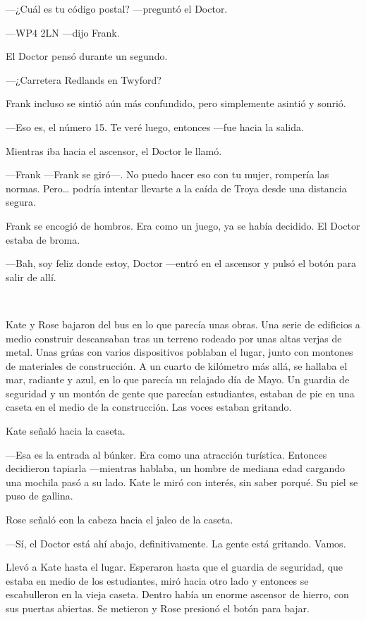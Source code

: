 ---¿Cuál es tu código postal? ---preguntó el Doctor.

---WP4 2LN ---dijo Frank.

El Doctor pensó durante un segundo.

---¿Carretera Redlands en Twyford?

Frank incluso se sintió aún más confundido, pero simplemente asintió y
sonrió.

---Eso es, el número 15. Te veré luego, entonces ---fue hacia la salida.

Mientras iba hacia el ascensor, el Doctor le llamó.

---Frank ---Frank se giró---. No puedo hacer eso con tu mujer, rompería las
normas. Pero\ldots{} podría intentar llevarte a la caída de Troya desde
una distancia segura.

Frank se encogió de hombros. Era como un juego, ya se había decidido. El
Doctor estaba de broma.

---Bah, soy feliz donde estoy, Doctor ---entró en el ascensor y pulsó el
botón para salir de allí.

~

Kate y Rose bajaron del bus en lo que parecía unas obras. Una serie de
edificios a medio construir descansaban tras un terreno rodeado por unas
altas verjas de metal. Unas grúas con varios dispositivos poblaban el
lugar, junto con montones de materiales de construcción. A un cuarto de
kilómetro más allá, se hallaba el mar, radiante y azul, en lo que
parecía un relajado día de Mayo. Un guardia de seguridad y un montón de
gente que parecían estudiantes, estaban de pie en una caseta en el medio
de la construcción. Las voces estaban gritando.

Kate señaló hacia la caseta.

---Esa es la entrada al búnker. Era como una atracción turística.
Entonces decidieron tapiarla ---mientras hablaba, un hombre de mediana
edad cargando una mochila pasó a su lado. Kate le miró con interés, sin
saber porqué. Su piel se puso de gallina.

Rose señaló con la cabeza hacia el jaleo de la caseta.

---Sí, el Doctor está ahí abajo, definitivamente. La gente está gritando.
Vamos.

Llevó a Kate hasta el lugar. Esperaron hasta que el guardia de
seguridad, que estaba en medio de los estudiantes, miró hacia otro lado
y entonces se escabulleron en la vieja caseta. Dentro había un enorme
ascensor de hierro, con sus puertas abiertas. Se metieron y Rose
presionó el botón para bajar.

